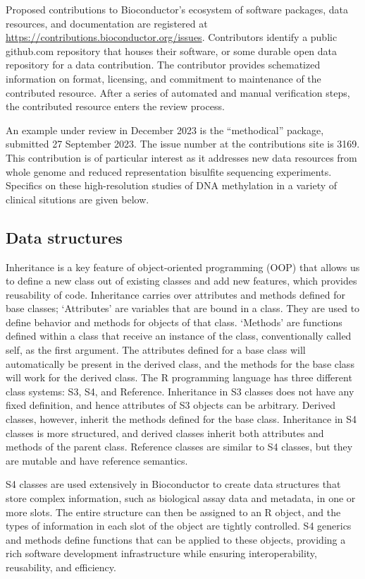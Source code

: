 Proposed contributions to Bioconductor's ecosystem of software packages,
data resources, and documentation are registered at
\url{https://contributions.bioconductor.org/issues}. Contributors
identify a public github.com repository that houses
their software, or some durable open data repository
for a data contribution. The contributor
provides schematized information on format, licensing, and commitment
to maintenance of the contributed resource. After a series of
automated and manual verification steps, the contributed
resource enters the review process.

An example under review in December 2023 is the ``methodical''
package, submitted 27 September 2023. The issue number
at the contributions site is 3169. This contribution is of
particular interest as it addresses new data resources from
whole genome and reduced representation bisulfite sequencing
experiments. Specifics on these high-resolution studies
of DNA methylation
in a variety of clinical situtions are given below.

\hypertarget{data-structures}{%
\subsection{Data structures}\label{data-structures}}

Inheritance is a key feature of object-oriented programming (OOP) that allows us to define a new class out of existing classes and add new features, which provides reusability of code. Inheritance carries over attributes and methods defined for base classes; `Attributes' are variables that are bound in a class. They are used to define behavior and methods for objects of that class. `Methods' are functions defined within a class that receive an instance of the class, conventionally called self, as the first argument. The attributes defined for a base class will automatically be present in the derived class, and the methods for the base class will work for the derived class. The R programming language has three different class systems: S3, S4, and Reference. Inheritance in S3 classes does not have any fixed definition, and hence attributes of S3 objects can be arbitrary. Derived classes, however, inherit the methods defined for the base class. Inheritance in S4 classes is more structured, and derived classes inherit both attributes and methods of the parent class. Reference classes are similar to S4 classes, but they are mutable and have reference semantics.

S4 classes are used extensively in Bioconductor to create data structures that store complex information, such as biological assay data and metadata, in one or more slots. The entire structure can then be assigned to an R object, and the types of information in each slot of the object are tightly controlled. S4 generics and methods define functions that can be applied to these objects, providing a rich software development infrastructure while ensuring interoperability, reusability, and efficiency.

